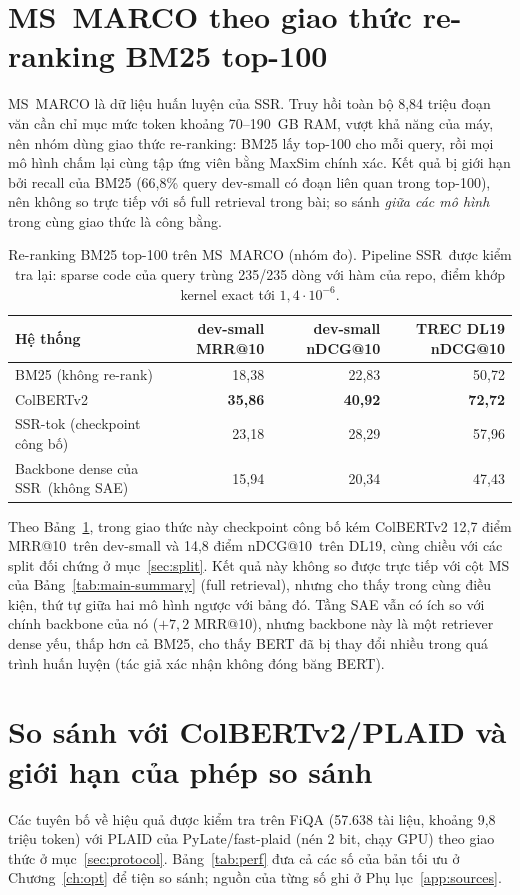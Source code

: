 \documentclass[a4paper,13pt]{extreport}
\makeatletter
\theoremstyle{plain}
\newcommand{\ssr}{SSR}
\newcommand{\ndcg}{nDCG@10}
\newcommand{\mrr}{MRR@10}
\makeatother
\begin{document}
\section{MS~MARCO theo giao thức re-ranking BM25 top-100}
\label{sec:msmarco}
MS~MARCO là dữ liệu huấn luyện của \ssr. Truy hồi toàn bộ 8,84 triệu đoạn văn cần chỉ mục mức token khoảng 70--190~GB RAM, vượt khả năng của máy, nên nhóm dùng giao thức re-ranking: BM25 lấy top-100 cho mỗi query, rồi mọi mô hình chấm lại cùng tập ứng viên bằng MaxSim chính xác. Kết quả bị giới hạn bởi recall của BM25 (66,8\% query dev-small có đoạn liên quan trong top-100), nên không so trực tiếp với số full retrieval trong bài; so sánh \emph{giữa các mô hình} trong cùng giao thức là công bằng.

\begin{table}[htbp]
\centering
\caption[Re-ranking BM25 top-100 trên MS~MARCO (nhóm đo)]{Re-ranking BM25 top-100 trên MS~MARCO (nhóm đo). Pipeline \ssr\ được kiểm tra lại: sparse code của query trùng 235/235 dòng với hàm của repo, điểm khớp kernel exact tới $1{,}4\cdot10^{-6}$.}
\label{tab:msmarco}
\small
\begin{tabular}{lrrr}
\toprule
\textbf{Hệ thống} & \textbf{dev-small \mrr} & \textbf{dev-small \ndcg} & \textbf{TREC DL19 \ndcg}\\
\midrule
BM25 (không re-rank) & 18,38 & 22,83 & 50,72\\
ColBERTv2 & \textbf{35,86} & \textbf{40,92} & \textbf{72,72}\\
\ssr-tok (checkpoint công bố) & 23,18 & 28,29 & 57,96\\
Backbone dense của \ssr\ (không SAE) & 15,94 & 20,34 & 47,43\\
\bottomrule
\end{tabular}
\end{table}

Theo Bảng~\ref{tab:msmarco}, trong giao thức này checkpoint công bố kém ColBERTv2 12,7 điểm \mrr\ trên dev-small và 14,8 điểm \ndcg\ trên DL19, cùng chiều với các split đối chứng ở mục~\ref{sec:split}. Kết quả này không so được trực tiếp với cột MS của Bảng~\ref{tab:main-summary} (full retrieval), nhưng cho thấy trong cùng điều kiện, thứ tự giữa hai mô hình ngược với bảng đó. Tầng SAE vẫn có ích so với chính backbone của nó ($+7{,}2$ \mrr), nhưng backbone này là một retriever dense yếu, thấp hơn cả BM25, cho thấy BERT đã bị thay đổi nhiều trong quá trình huấn luyện (tác giả xác nhận không đóng băng BERT).

\section{So sánh với ColBERTv2/PLAID và giới hạn của phép so sánh}
\label{sec:perf}
Các tuyên bố về hiệu quả được kiểm tra trên FiQA (57.638 tài liệu, khoảng 9,8 triệu token) với PLAID của PyLate/fast-plaid (nén 2 bit, chạy GPU) theo giao thức ở mục~\ref{sec:protocol}. Bảng~\ref{tab:perf} đưa cả các số của bản tối ưu ở Chương~\ref{ch:opt} để tiện so sánh; nguồn của từng số ghi ở Phụ lục~\ref{app:sources}.
\end{document}
